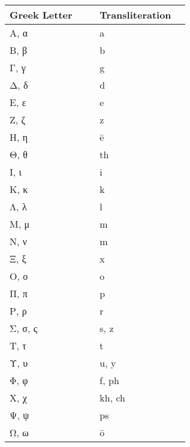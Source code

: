 \begin{center}
	\begin{longtable}{p{0.45\linewidth} | p{0.45\linewidth}}
    	Greek Letter & Transliteration \\ [0.5ex]
    	
    \hline\hline
    Α, α & a \\
    \hline
    Β, β & b \\
    \hline
    Γ, γ & g \\
    \hline
    Δ, δ & d \\
    \hline
    Ε, ε & e \\
    \hline
    Ζ, ζ & z \\
    \hline
    Η, η & \=e \\
    \hline
    Θ, θ & th \\
    \hline
    Ι, ι & i \\
    \hline
    Κ, κ & k \\
    \hline
    Λ, λ & l \\
    \hline
    Μ, μ & m \\
    \hline
    Ν, ν & m \\
    \hline
    Ξ, ξ & x \\
    \hline
    Ο, ο & o \\
    \hline
    Π, π & p \\
    \hline
    Ρ, ρ & r \\
    \hline
    Σ, σ, ς & s, z \\
    \hline
    Τ, τ & t \\
    \hline
    Υ, υ & u, y \\
    \hline
    Φ, φ & f, ph \\
    \hline
    Χ, χ & kh, ch \\
    \hline
    Ψ, ψ & ps \\
    \hline
    Ω, ω & \=o \\
    \hline
	\end{longtable}
\end{center}